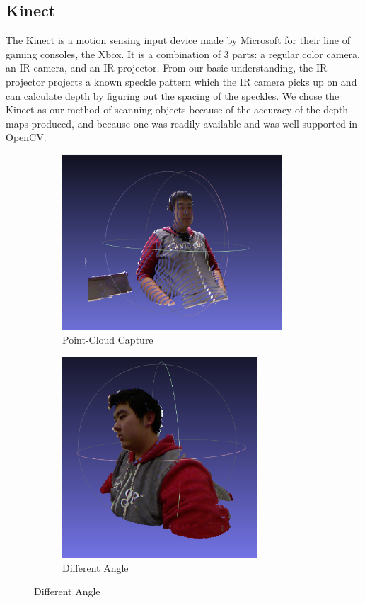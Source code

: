 \documentclass[11pt,oneside,english]{article}
\begin{document}
\subsection{Kinect}

The Kinect is a motion sensing input device made by Microsoft for their line of
gaming consoles, the Xbox. It is a combination of 3 parts: a regular color
camera, an IR camera, and an IR projector. From our basic understanding, the IR
projector projects a known speckle pattern which the IR camera picks up on and
can calculate depth by figuring out the spacing of the speckles. We chose the
Kinect as our method of scanning objects because of the accuracy of the depth
maps produced, and because one was readily available and was well-supported in
OpenCV.

\begin{figure}
  \centering
  \begin{subfigure}[b]{0.45\textwidth}
    \includegraphics[width=0.9\textwidth]{jon1}
    \caption{Point-Cloud Capture}
    \label{fig:awesome_image}
  \end{subfigure}
  \begin{subfigure}[b]{0.45\textwidth}
    \includegraphics[width=0.8\textwidth]{jon2}
    \caption{Different Angle}
    \label{fig:awesome_image}
  \end{subfigure}
\end{figure}
\end{document}
